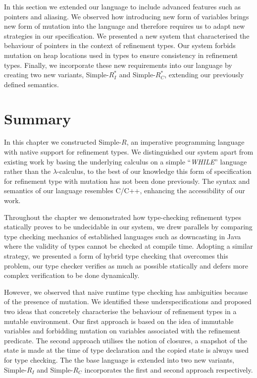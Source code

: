 \documentclass[a4paper,12pt]{report}
\begin{document}
\par
In this section we extended our language to include advanced features such 
as pointers and aliasing. We observed how introducing new form of 
variables brings new form of mutation into the language and therefore 
requires us to adapt new strategies in our specification. We presented  
a new system that characterised the behaviour of pointers in the context of 
refinement types. Our system forbids mutation on heap locations used in types 
to ensure consistency in refinement types. Finally, we incorporate these new requirements 
into our language by creating two new variants, Simple-$R^{*}_{I}$ 
and Simple-$R^{*}_{C}$, extending our previously defined semantics. 

\section{Summary}
In this chapter we constructed Simple-$R$, an imperative programming language with native 
support for refinement types. We distinguished our 
system apart from existing work by basing the underlying calculus 
on a simple ``\textit{WHILE}'' language 
rather than the $\lambda$-calculus, to the best of our knowledge this form of 
specification for refinement type with mutation has not been done 
previously. The syntax and semantics of our 
language resembles C/C++, enhancing the accessibility of our work.

\par
Throughout the chapter we demonstrated how type-checking refinement types 
statically proves to be undecidable in our system, we drew parallels by comparing 
type checking mechanics of established languages such as downcasting in Java 
where the validity of types cannot be checked at compile time. 
Adopting a similar strategy, we presented a form of hybrid type checking 
that overcomes this problem, our type checker verifies as much as possible 
statically and defers more complex verification to be done dynamically. 

\par
However, we observed that naive runtime type checking has ambiguities 
because of the presence of mutation. We identified these underspecifications and 
proposed two ideas that concretely characterise the behaviour of refinement 
types in a mutable environment. Our first approach is based on the 
idea of immutable variables and forbidding mutation on variables associated 
with the refinement predicate. The second approach utilises the notion of closures, 
a snapshot of the state is made at the time of type declaration and the copied 
state is always used for type checking. The the base language is extended into two 
new variants, Simple-$R_{I}$ and Simple-$R_{C}$ incorporates the first 
and second approach respectively.
\end{document}
